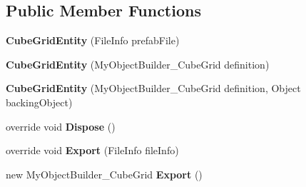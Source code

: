 \subsection*{Public Member Functions}
\begin{DoxyCompactItemize}
\item 
\hypertarget{class_s_e_mod_a_p_i_internal_1_1_a_p_i_1_1_entity_1_1_sector_1_1_sector_object_1_1_cube_grid_entity_a0b234a80ed52b53f0995add46e38e6ae}{}{\bfseries Cube\+Grid\+Entity} (File\+Info prefab\+File)\label{class_s_e_mod_a_p_i_internal_1_1_a_p_i_1_1_entity_1_1_sector_1_1_sector_object_1_1_cube_grid_entity_a0b234a80ed52b53f0995add46e38e6ae}

\item 
\hypertarget{class_s_e_mod_a_p_i_internal_1_1_a_p_i_1_1_entity_1_1_sector_1_1_sector_object_1_1_cube_grid_entity_a9275021f0ef8ad5b3a40f609dedee693}{}{\bfseries Cube\+Grid\+Entity} (My\+Object\+Builder\+\_\+\+Cube\+Grid definition)\label{class_s_e_mod_a_p_i_internal_1_1_a_p_i_1_1_entity_1_1_sector_1_1_sector_object_1_1_cube_grid_entity_a9275021f0ef8ad5b3a40f609dedee693}

\item 
\hypertarget{class_s_e_mod_a_p_i_internal_1_1_a_p_i_1_1_entity_1_1_sector_1_1_sector_object_1_1_cube_grid_entity_a08f7f3f57ce846ded1c38f3c9870e816}{}{\bfseries Cube\+Grid\+Entity} (My\+Object\+Builder\+\_\+\+Cube\+Grid definition, Object backing\+Object)\label{class_s_e_mod_a_p_i_internal_1_1_a_p_i_1_1_entity_1_1_sector_1_1_sector_object_1_1_cube_grid_entity_a08f7f3f57ce846ded1c38f3c9870e816}

\item 
\hypertarget{class_s_e_mod_a_p_i_internal_1_1_a_p_i_1_1_entity_1_1_sector_1_1_sector_object_1_1_cube_grid_entity_a29f77bf71d102967baf7731b5e3dbbbd}{}override void {\bfseries Dispose} ()\label{class_s_e_mod_a_p_i_internal_1_1_a_p_i_1_1_entity_1_1_sector_1_1_sector_object_1_1_cube_grid_entity_a29f77bf71d102967baf7731b5e3dbbbd}

\item 
\hypertarget{class_s_e_mod_a_p_i_internal_1_1_a_p_i_1_1_entity_1_1_sector_1_1_sector_object_1_1_cube_grid_entity_a9f615a14d10cedbac20df9b6be72c4fa}{}override void {\bfseries Export} (File\+Info file\+Info)\label{class_s_e_mod_a_p_i_internal_1_1_a_p_i_1_1_entity_1_1_sector_1_1_sector_object_1_1_cube_grid_entity_a9f615a14d10cedbac20df9b6be72c4fa}

\item 
\hypertarget{class_s_e_mod_a_p_i_internal_1_1_a_p_i_1_1_entity_1_1_sector_1_1_sector_object_1_1_cube_grid_entity_a48fe000083960c4b088191ef4bed4f45}{}new My\+Object\+Builder\+\_\+\+Cube\+Grid {\bfseries Export} ()\label{class_s_e_mod_a_p_i_internal_1_1_a_p_i_1_1_entity_1_1_sector_1_1_sector_object_1_1_cube_grid_entity_a48fe000083960c4b088191ef4bed4f45}


\end{DoxyCompactItemize}
